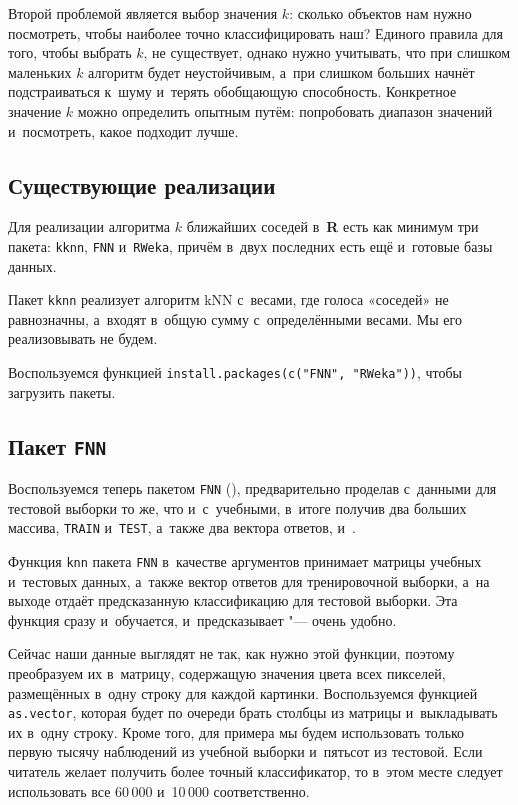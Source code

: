 \documentclass[final,pdftex]{../../template/epsilonj}\usepackage[]{graphicx}\usepackage[]{color}
\begin{document}
Второй проблемой является выбор значения $k$: сколько объектов нам нужно посмотреть, чтобы наиболее точно классифицировать наш? 
Единого правила для того, чтобы выбрать $k$, не существует, однако нужно учитывать, что при слишком маленьких $k$ алгоритм будет неустойчивым, а~при слишком больших начнёт подстраиваться к~шуму и~терять обобщающую способность. 
Конкретное значение $k$ можно определить опытным путём: попробовать диапазон значений и~посмотреть, какое подходит лучше.

\subsection{Существующие реализации}

Для реализации алгоритма $k$ ближайших соседей в~\textbf{R} есть как минимум три пакета: \texttt{kknn}, \texttt{FNN} и~\texttt{RWeka}, причём в~двух последних есть ещё и~готовые базы данных.

Пакет \texttt{kknn} реализует алгоритм kNN с~весами, где голоса «соседей» не равнозначны, а~входят в~общую сумму с~определёнными весами. Мы его реализовывать не будем.

Воспользуемся функцией \verb|install.packages(c("FNN", "RWeka"))|, чтобы загрузить пакеты.

\subsection{Пакет \texttt{FNN}}

Воспользуемся теперь пакетом \texttt{FNN} (\cite{RFNNpackage14}), предварительно проделав с~данными для тестовой выборки то же, что и~с~учебными, в~итоге получив два больших массива, \texttt{TRAIN} и~\texttt{TEST}, а~также два вектора ответов,  и~. 



Функция \texttt{knn} пакета \texttt{FNN} в~качестве аргументов принимает матрицы учебных и~тестовых данных, а~также вектор ответов для тренировочной выборки, а~на выходе отдаёт предсказанную классификацию для тестовой выборки. 
Эта функция сразу и~обучается, и~предсказывает "--- очень удобно.

Сейчас наши данные выглядят не так, как нужно этой функции, поэтому преобразуем их в~матрицу, содержащую значения цвета всех пикселей, размещённых в~одну строку для каждой картинки. 
Воспользуемся функцией \texttt{as.vector}, которая будет по очереди брать столбцы из матрицы и~выкладывать их в~одну строку. 
Кроме того, для примера мы будем использовать только первую тысячу наблюдений из учебной выборки и~пятьсот из тестовой. 
Если читатель желает получить более точный классификатор, то в~этом месте следует использовать все 60\,000 и~10\,000 соответственно.
\end{document}
